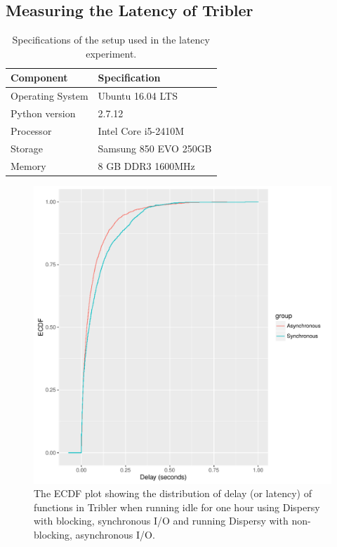 \subsection{Measuring the Latency of Tribler}

\begin{table}[h]
	\centering
	\caption{Specifications of the setup used in the latency experiment.}
	\label{table:specs_hp_elitebook}
	\begin{tabular}{l|l}
		\textbf{Component}	& \textbf{Specification} \\ \hline
		Operating System   	& Ubuntu 16.04 LTS \\
		Python version		& 2.7.12 \\
		Processor			& Intel Core i5-2410M \\ 
		Storage				& Samsung 850 EVO 250GB  \\ 
		Memory				& 8 GB DDR3 1600MHz \\
	\end{tabular}
\end{table}

\begin{figure}[!h]
	\centering
	\includegraphics[width=\linewidth]{experimentation/images/ecdf_latency_idle}
	\caption{The ECDF plot showing the distribution of delay (or latency) of functions in Tribler when running idle for one hour using Dispersy with blocking, synchronous I/O and running Dispersy with non-blocking, asynchronous I/O.}
	\label{fig:ecdf_latency_idle}
\end{figure} 

